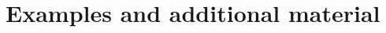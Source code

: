 \documentclass[../main.tex]{subfiles}
\begin{document}
\setcounter{chapter}{10}
\chapter{Examples and additional material}
\end{document}
